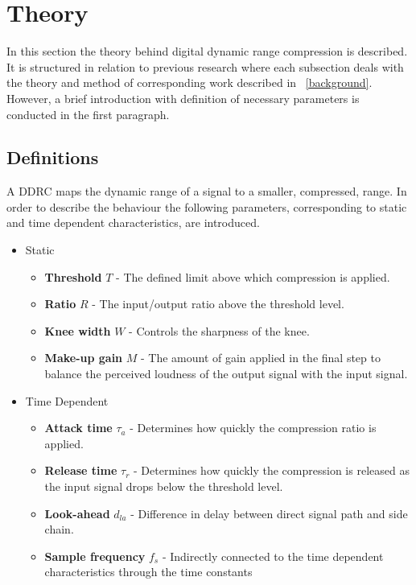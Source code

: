 \documentclass[../main2.tex]{subfiles}
\begin{document}
\section{Theory}\label{sec_theory}
In this section the theory behind digital dynamic range compression is described. It is structured in relation to previous research where each subsection deals with the theory and method of corresponding work described in ~\ref{background}. However, a brief introduction with definition of necessary parameters is conducted in the first paragraph. 

\subsection{Definitions}
A DDRC maps the dynamic range of a signal to a smaller, compressed, range. In order to describe the behaviour the following parameters, corresponding to static and time dependent characteristics, are introduced.
\begin{itemize}
\item{Static}
	\begin{itemize}
	\item \textbf{Threshold} $T$ - The defined limit above which compression is applied.
	\item \textbf{Ratio} $R$ - The input/output ratio above the threshold level.
	\item \textbf{Knee width}  $W$ - Controls the sharpness of the knee.
	\item \textbf{Make-up gain}  $M$ - The amount of gain applied in the final step to balance the perceived loudness of the output signal with the input signal.
\end{itemize}
\item{Time Dependent}
	\begin{itemize}
	\item \textbf{Attack time} $\tau_{a}$ - Determines how quickly the compression ratio is applied.
	\item \textbf{Release time} $\tau_{r}$ - Determines how quickly the compression is released as the input signal drops below the threshold level.
	\item \textbf{Look-ahead} $d_{la}$ - Difference in delay between direct signal path and side chain. 
	\item \textbf{Sample frequency} $f_{s}$ - Indirectly connected to the time dependent characteristics through the time constants
	\end{itemize}
\end{itemize}
\end{document}
